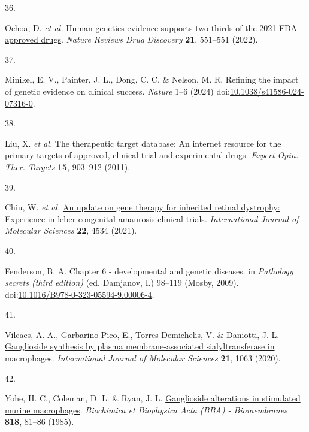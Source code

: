 \documentclass[
]{article}
\newlength{\cslhangindent}
\newlength{\csllabelwidth}
\newenvironment{CSLReferences}[2] %
 {\begin{list}{}{%
  \setlength{\itemindent}{0pt}
  \setlength{\leftmargin}{0pt}
  \setlength{\parsep}{0pt}
  \ifodd #1
   \setlength{\leftmargin}{\cslhangindent}
   \setlength{\itemindent}{-1\cslhangindent}
  \fi
  \setlength{\itemsep}{#2\baselineskip}}}
 {\end{list}}
\newcommand{\CSLLeftMargin}[1]{\parbox[t]{\csllabelwidth}{\strut#1\strut}}
\newcommand{\CSLRightInline}[1]{\parbox[t]{\linewidth - \csllabelwidth}{\strut#1\strut}}
\begin{document}
\begin{CSLReferences}{0}{0}
\CSLLeftMargin{36. }%
\CSLRightInline{Ochoa, D. \emph{et al.}
\href{https://doi.org/10.1038/d41573-022-00120-3}{Human genetics
evidence supports two-thirds of the 2021 FDA-approved drugs}.
\emph{Nature Reviews Drug Discovery} \textbf{21}, 551--551 (2022).}

\CSLLeftMargin{37. }%
\CSLRightInline{Minikel, E. V., Painter, J. L., Dong, C. C. \& Nelson,
M. R. Refining the impact of genetic evidence on clinical success.
\emph{Nature} 1--6 (2024)
doi:\href{https://doi.org/10.1038/s41586-024-07316-0}{10.1038/s41586-024-07316-0}.}

\CSLLeftMargin{38. }%
\CSLRightInline{Liu, X. \emph{et al.} The therapeutic target database:
An internet resource for the primary targets of approved, clinical trial
and experimental drugs. \emph{Expert Opin. Ther. Targets} \textbf{15},
903--912 (2011).}

\CSLLeftMargin{39. }%
\CSLRightInline{Chiu, W. \emph{et al.}
\href{https://doi.org/10.3390/ijms22094534}{An update on gene therapy
for inherited retinal dystrophy: Experience in leber congenital
amaurosis clinical trials}. \emph{International Journal of Molecular
Sciences} \textbf{22}, 4534 (2021).}

\CSLLeftMargin{40. }%
\CSLRightInline{Fenderson, B. A. Chapter 6 - developmental and genetic
diseases. in \emph{Pathology secrets (third edition)} (ed. Damjanov, I.)
98--119 (Mosby, 2009).
doi:\href{https://doi.org/10.1016/B978-0-323-05594-9.00006-4}{10.1016/B978-0-323-05594-9.00006-4}.}

\CSLLeftMargin{41. }%
\CSLRightInline{Vilcaes, A. A., Garbarino-Pico, E., Torres Demichelis,
V. \& Daniotti, J. L.
\href{https://doi.org/10.3390/ijms21031063}{Ganglioside synthesis by
plasma membrane-associated sialyltransferase in macrophages}.
\emph{International Journal of Molecular Sciences} \textbf{21}, 1063
(2020).}

\CSLLeftMargin{42. }%
\CSLRightInline{Yohe, H. C., Coleman, D. L. \& Ryan, J. L.
\href{https://doi.org/10.1016/0005-2736(85)90141-5}{Ganglioside
alterations in stimulated murine macrophages}. \emph{Biochimica et
Biophysica Acta (BBA) - Biomembranes} \textbf{818}, 81--86 (1985).}


\end{CSLReferences}
\end{document}
